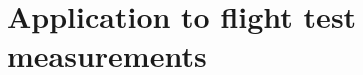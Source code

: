 \documentclass[10pt,xcolor=x11names,compress, show notes]{beamer}%
\begin{document}
\section{Application to flight test measurements}
\begin{frame}
\end{frame}
\begin{frame}{\insertsectionhead}


\end{frame}
\end{document}
